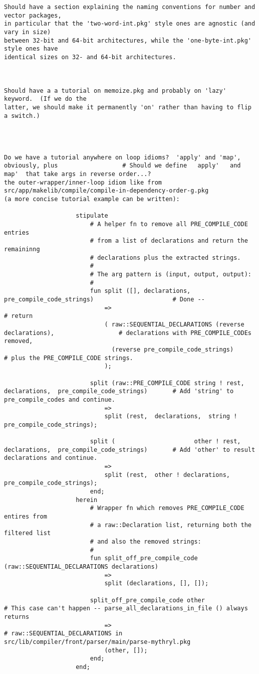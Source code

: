 \begin{verbatim}
Should have a section explaining the naming conventions for number and vector packages,
in particular that the 'two-word-int.pkg' style ones are agnostic (and vary in size)
between 32-bit and 64-bit architectures, while the 'one-byte-int.pkg' style ones have
identical sizes on 32- and 64-bit architectures.



Should have a a tutorial on memoize.pkg and probably on 'lazy' keyword.  (If we do the
latter, we should make it permanently 'on' rather than having to flip a switch.)




Do we have a tutorial anywhere on loop idioms?  'apply' and 'map', obviously, plus					# Should we define   apply'   and   map'  that take args in reverse order...?
the outer-wrapper/inner-loop idiom like from  src/app/makelib/compile/compile-in-dependency-order-g.pkg
(a more concise tutorial example can be written):

					stipulate
					    # A helper fn to remove all PRE_COMPILE_CODE entries
					    # from a list of declarations and return the remaininng
					    # declarations plus the extracted strings.
					    #	
					    # The arg pattern is (input, output, output):
					    #	
					    fun split ([], declarations, pre_compile_code_strings)						# Done --
						    =>												# return 
						    ( raw::SEQUENTIAL_DECLARATIONS (reverse declarations),					# declarations with PRE_COMPILE_CODEs removed,
						      (reverse pre_compile_code_strings)							# plus the PRE_COMPILE_CODE strings.
						    );

						split (raw::PRE_COMPILE_CODE string ! rest,  declarations,  pre_compile_code_strings)		# Add 'string' to pre_compile_codes and continue.
						    =>
						    split (rest,  declarations,  string ! pre_compile_code_strings);
						    	
						split (                      other ! rest,   declarations,  pre_compile_code_strings)		# Add 'other' to result declarations and continue.
						    =>
						    split (rest,  other ! declarations,  pre_compile_code_strings);
					    end;
					herein
					    # Wrapper fn which removes PRE_COMPILE_CODE entires from
					    # a raw::Declaration list, returning both the filtered list
					    # and also the removed strings:
					    #
					    fun split_off_pre_compile_code (raw::SEQUENTIAL_DECLARATIONS declarations)
						    =>
						    split (declarations, [], []);

						split_off_pre_compile_code other								# This case can't happen -- parse_all_declarations_in_file () always returns
						    =>												# raw::SEQUENTIAL_DECLARATIONS in   src/lib/compiler/front/parser/main/parse-mythryl.pkg 
						    (other, []);
					    end;
					end;




\end{verbatim}
